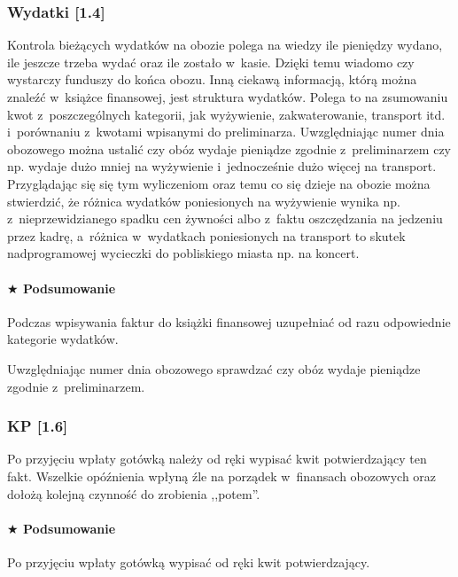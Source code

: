 \documentclass[a5paper,10pt,titlepage,twoside]{article}
\newcommand*{\thecheckbox}{\hss$\Box$} %
\newenvironment*{checklist}
{\list{}{%
\renewcommand*{\makelabel}[1]{\thecheckbox}}}
{\endlist}
\begin{document}
\subsubsection{Wydatki [1.4]}
Kontrola bieżących wydatków na obozie polega na wiedzy ile pieniędzy wydano, ile jeszcze trzeba wydać oraz ile zostało w~kasie. Dzięki temu wiadomo czy wystarczy funduszy do końca obozu. Inną ciekawą informacją, którą można znaleźć w~książce finansowej, jest struktura wydatków. Polega to na zsumowaniu kwot z~poszczególnych kategorii, jak wyżywienie, zakwaterowanie, transport itd. i~porównaniu z~kwotami wpisanymi do preliminarza. Uwzględniając numer dnia obozowego można ustalić czy obóz wydaje pieniądze zgodnie z~preliminarzem czy np. wydaje dużo mniej na wyżywienie i~jednocześnie dużo więcej na transport. Przyglądając się się tym wyliczeniom oraz temu co się dzieje na obozie można stwierdzić, że różnica wydatków poniesionych na wyżywienie wynika np. z~nieprzewidzianego spadku cen żywności albo z~faktu oszczędzania na jedzeniu przez kadrę, a~różnica w~wydatkach poniesionych na transport to skutek nadprogramowej wycieczki do pobliskiego miasta np. na koncert.
\paragraph{$\bigstar$ Podsumowanie}
\begin{checklist}
\item Podczas wpisywania faktur do książki finansowej uzupełniać od razu odpowiednie kategorie wydatków.
\item Uwzględniając numer dnia obozowego sprawdzać czy obóz wydaje pieniądze zgodnie z~preliminarzem.
\end{checklist}
\subsubsection{KP [1.6]\label{kwity-kp}}
Po przyjęciu wpłaty gotówką należy od ręki wypisać kwit potwierdzający ten fakt. Wszelkie opóźnienia wpłyną źle na porządek w~finansach obozowych oraz dołożą kolejną czynność do zrobienia ,,potem''.
\paragraph{$\bigstar$ Podsumowanie}
\begin{checklist}
\item Po przyjęciu wpłaty gotówką wypisać od ręki kwit potwierdzający.
\end{checklist}
\end{document}
